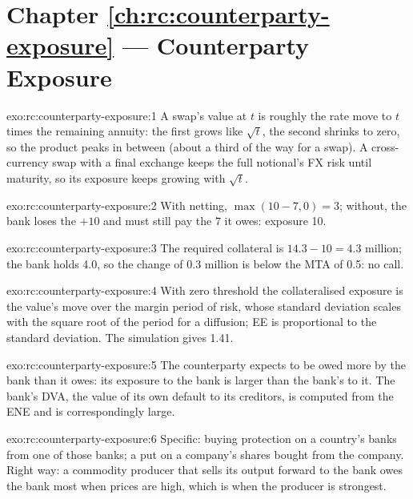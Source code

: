 \section*{Chapter \ref{ch:rc:counterparty-exposure} --- Counterparty Exposure}

\begin{solution}{exo:rc:counterparty-exposure:1}
A swap's value at $t$ is roughly the rate move to $t$ times the remaining annuity: the first
grows like $\sqrt t$, the second shrinks to zero, so the product peaks in between (about a
third of the way for a swap). A cross-currency swap with a final exchange keeps the full
notional's FX risk until maturity, so its exposure keeps growing with $\sqrt t$.
\end{solution}

\begin{solution}{exo:rc:counterparty-exposure:2}
With netting, $\max(10-7,0) = 3$; without, the bank loses the $+10$ and must still pay the
$7$ it owes: exposure 10.
\end{solution}

\begin{solution}{exo:rc:counterparty-exposure:3}
The required collateral is $14.3-10 = 4.3$ million; the bank holds 4.0, so the change of
0.3 million is below the MTA of 0.5: no call.
\end{solution}

\begin{solution}{exo:rc:counterparty-exposure:4}
With zero threshold the collateralised exposure is the value's move over the margin period
of risk, whose standard deviation scales with the square root of the period for a diffusion;
EE is proportional to the standard deviation. The simulation gives 1.41.
\end{solution}

\begin{solution}{exo:rc:counterparty-exposure:5}
The counterparty expects to be owed more by the bank than it owes: its exposure to the bank
is larger than the bank's to it. The bank's DVA, the value of its own default to its
creditors, is computed from the ENE and is correspondingly large.
\end{solution}

\begin{solution}{exo:rc:counterparty-exposure:6}
Specific: buying protection on a country's banks from one of those banks; a put on a
company's shares bought from the company. Right way: a commodity producer that sells its
output forward to the bank owes the bank most when prices are high, which is when the
producer is strongest.
\end{solution}

